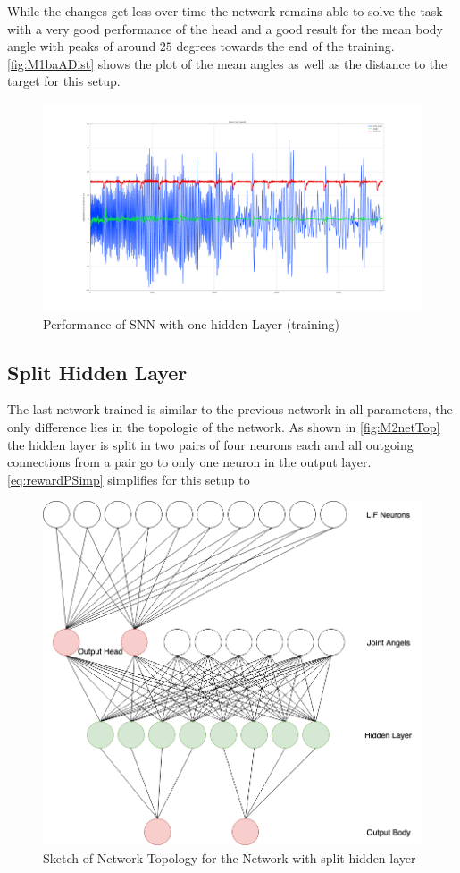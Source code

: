 While the changes get less over time the network remains able to solve the task with a very good performance of the head and a good result for the mean body angle with peaks of around $25$ degrees towards the end of the training. \autoref{fig:M1baADist} shows the plot of the mean angles as well as the distance to the target for this setup.
\begin{figure}[htpb]
  \centering
  \includegraphics[width=\textwidth]{figures/plots/M1baADist}
  \caption{ Performance of SNN with one hidden Layer (training)  }
  \label{fig:M1baADist}
\end{figure}
\subsection{Split Hidden Layer}
The last network trained is similar to the previous network in all parameters, the only difference lies in the topologie of the network. As shown in \autoref{fig:M2netTop} the hidden layer is split in two pairs of four neurons each and all outgoing connections from a pair go to only one neuron in the output layer. \autoref{eq:rewardPSimp} simplifies for this setup to

\begin{figure}[htpb]
  \centering
  \includegraphics[width=\textwidth]{figures/plots/M2netTop}
  \caption{ Sketch of Network Topology for the Network with split hidden layer  }
  \label{fig:M2netTop}
\end{figure}

